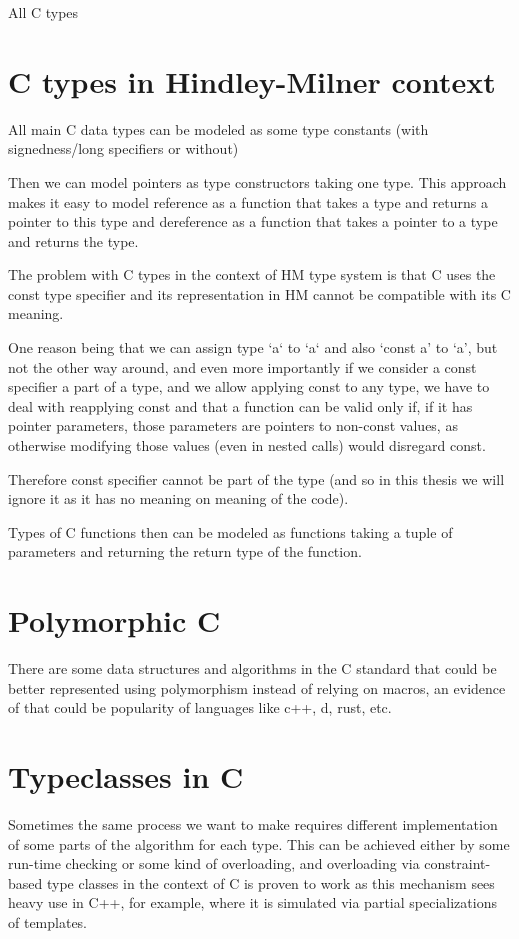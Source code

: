 All C types

\section{C types in Hindley-Milner context}

All main C data types can be modeled as some type constants (with signedness/long specifiers or without)

Then we can model pointers as type constructors taking one type.
This approach makes it easy to model reference as a function that takes a type and returns a pointer to this type
and dereference as a function that takes a pointer to a type and returns the type.

The problem with C types in the context of HM type system is that C uses the const type specifier and its representation
in HM cannot be compatible with its C meaning.

One reason being that we can assign type `a` to `a` and also `const a' to `a', but not the other way around, and even
more importantly if we consider a const specifier a part of a type, and we allow applying const to any type, we have
to deal with reapplying const and that a function can be valid only if, if it has pointer parameters, those parameters
are pointers to non-const values, as otherwise modifying those values (even in nested calls) would disregard const.

Therefore const specifier cannot be part of the type (and so in this thesis we will ignore it as it has no meaning on
meaning of the code).

Types of C functions then can be modeled as functions taking a tuple of parameters and returning the return type of the
function.


\section{Polymorphic C}

There are some data structures and algorithms in the C standard that could be better represented using polymorphism instead of relying on
macros, an evidence of that could be popularity of languages like c++, d, rust, etc.

\section{Typeclasses in C}

Sometimes the same process we want to make requires different implementation of some parts of the algorithm
for each type. This can be achieved either by some run-time checking or some kind of overloading, and overloading via
constraint-based type classes in the context of C is proven to work as this mechanism sees heavy use in C++, for example,
where it is simulated via partial specializations of templates.

